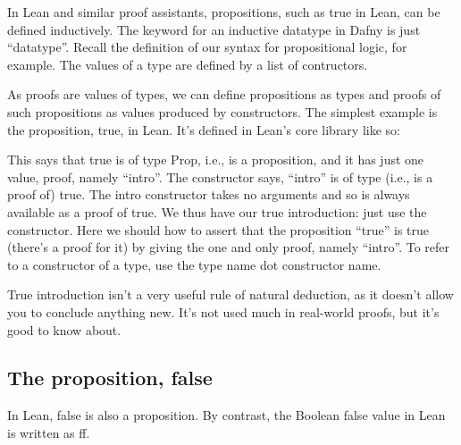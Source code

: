\documentclass[letterpaper,10pt,english]{sphinxmanual}
\begin{document}
In Lean and similar proof assistants, propositions, such as true in
Lean, can be defined inductively. The keyword for an inductive
datatype in Dafny is just “datatype”. Recall the definition of our
syntax for propositional logic, for example. The values of a type are
defined by a list of contructors.

As proofs are values of types, we can define propositions as types and
proofs of such propositions as values produced by constructors. The
simplest example is the proposition, true, in Lean. It’s defined in
Lean’s core library like so:

\begin{sphinxVerbatim}[commandchars=\\\{\}]
   
   
\end{sphinxVerbatim}

This says that true is of type Prop, i.e., is a proposition, and it
has just one value, proof, namely “intro”. The constructor says,
“intro” is of type (i.e., is a proof of) true. The intro constructor
takes no arguments and so is always available as a proof of true.  We
thus have our true introduction: just use the constructor. Here we
should how to assert that the proposition “true” is true (there’s a
proof for it) by giving the one and only proof, namely “intro”.  To
refer to a constructor of a type, use the type name dot constructor
name.

\begin{sphinxVerbatim}[commandchars=\\\{\}]
    
\end{sphinxVerbatim}

True introduction isn’t a very useful rule of natural deduction, as it
doesn’t allow you to conclude anything new. It’s not used much in
real-world proofs, but it’s good to know about.


\subsection{The proposition, false}
\label{\detokenize{15-proofs:the-proposition-false}}
In Lean, false is also a proposition. By contrast, the Boolean false
value in Lean is written as ff.

\begin{sphinxVerbatim}[commandchars=\\\{\}]
     
        
\end{sphinxVerbatim}
\end{document}
